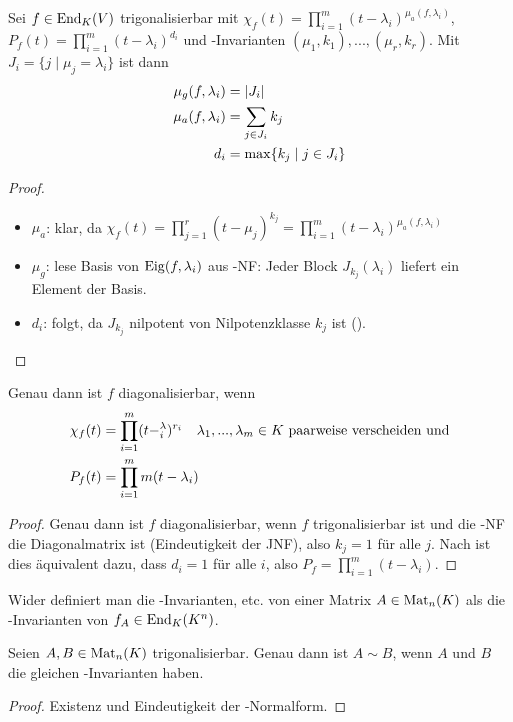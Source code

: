 \begin{conclusion}
	Sei $f\in\operatorname{End}_K(V)$ trigonalisierbar mit $\chi_f(t)=\prod_{i=1}^m (t-\lambda_i)^{\mu_a(f,\lambda_i)}$, $P_f(t)=\prod_{i=1}^m (t-\lambda_i)^{d_i}$ und -Invarianten $(\mu_1,k_1),...,(\mu_r,k_r)$. Mit $J_i=\{j\mid \mu_j=\lambda_i\}$ ist dann 
	\begin{align}
		\mu_g(f,\lambda_i)&= \vert J_i \vert \notag \\
		\mu_a(f,\lambda_i) &= \sum_{j\in J_i} k_j\notag \\
		d_i&= \max\{k_j\mid j\in J_i\}\notag
	\end{align}
\end{conclusion}
\begin{proof}
	\begin{itemize}
		\item $\mu_a$: klar, da $\chi_f(t)=\prod_{j=1}^r (t-\mu_j)^{k_j}=\prod_{i=1}^m (t-\lambda_i)^{\mu_a(f,\lambda_i)}$
		\item $\mu_g$: lese Basis von $\operatorname{Eig}(f,\lambda_i)$ aus -NF: Jeder Block $J_{k_j}(\lambda_i)$ liefert ein Element der Basis.
		\item $d_i$: folgt, da $J_{k_j}$ nilpotent von Nilpotenzklasse $k_j$ ist ().
	\end{itemize}
\end{proof}

\begin{conclusion}
	Genau dann ist $f$ diagonalisierbar, wenn 
	\begin{align}
		\chi_f(t)&=\prod_{i=1}^m (t-^\lambda_i)^{r_i}\quad \lambda_1,...,\lambda_m\in K\text{ paarweise verscheiden und} \notag \\
		P_f(t) &= \prod_{i=1}^mm (t-\lambda_i)\notag
	\end{align}
\end{conclusion}
\begin{proof}
	Genau dann ist $f$ diagonalisierbar, wenn $f$ trigonalisierbar ist und die -NF die Diagonalmatrix ist (Eindeutigkeit der JNF), also $k_j=1$ für alle $j$. Nach  ist dies äquivalent dazu, dass $d_i=1$ für alle $i$, also $P_f=\prod_{i=1}^m (t-\lambda_i)$.
\end{proof}

\begin{remark}
	Wider definiert man die -Invarianten, etc. von einer Matrix $A\in\operatorname{Mat}_n(K)$ als die -Invarianten von $f_A\in\operatorname{End}_K(K^n)$.
\end{remark}

\begin{conclusion}
	Seien $A,B\in\operatorname{Mat}_n(K)$ trigonalisierbar. Genau dann ist $A\sim B$, wenn $A$ und $B$ die gleichen -Invarianten haben.
\end{conclusion}
\begin{proof}
	Existenz und Eindeutigkeit der -Normalform.
\end{proof}